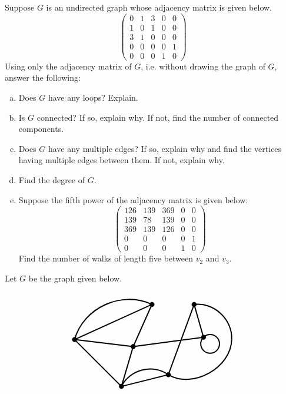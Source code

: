 \documentclass[12pt,letterpaper]{exam}
\begin{document}
\begin{questions}
\newpage
\question[10] Suppose $G$ is an undirected graph whose adjacency matrix is given below. 
	\[
	\begin{pmatrix}
	0 & 1 & 3 & 0 & 0 \\
	1 & 0 & 1 & 0 & 0 \\
	3 & 1 & 0 & 0 & 0 \\
	0 & 0 & 0 & 0 & 1 \\
	0 & 0 & 0 & 1 & 0 
	\end{pmatrix}
	\]
Using only the adjacency matrix of $G$, i.e. without drawing the graph of $G$, answer the following:
        \begin{enumerate}[(a)]
        \item Does $G$ have any loops? Explain.
        \item Is $G$ connected? If so, explain why. If not, find the number of connected components.
        \item Does $G$ have any multiple edges? If so, explain why and find the vertices having multiple edges between them. If not, explain why. 
        \item Find the degree of $G$.
        \item Suppose the fifth power of the adjacency matrix is given below:
		\[
		\begin{pmatrix}
		126 & 139 & 369 & 0 & 0 \\
		139 & 78 & 139 & 0 & 0 \\
		369 & 139 & 126 & 0 & 0 \\
		0 & 0 & 0 & 0 & 1 \\
		0 & 0 & 0 & 1 & 0 
		\end{pmatrix}
		\]
	Find the number of walks of length five between $v_2$ and $v_3$. 
        \end{enumerate}




\newpage
\question[10] Let $G$ be the graph given below.
	\[
	\begin{tikzpicture}
	\draw[line width=0.05cm] (0,0) -- (-2,2) -- (1.3,3.5) -- (0.5,1.7) -- (3.5,2.1) -- (3.1,3.5) -- (2,0.5) -- (0,0);
	\draw[line width=0.05cm] (-2,2) -- (0.5,1.7);
	\draw[line width=0.05cm] (0,0) -- (0.5,1.7);
	\draw[line width=0.05cm, bend left= 50] (-2,2) to (1.3,3.5);
	\draw[line width=0.05cm, bend left= 50] (0,0) to (2,0.5);
	\draw[line width=0.05cm, bend right= 60] (2,0.5) to (4.7,2);
	\draw[line width=0.05cm, bend right= 50] (4.7,2) to (3.1,3.5);
	\draw[line width=0.05cm] (3.782,1.817) circle (0.4);
	
	\draw[fill= black] (0,0) circle (0.1);
	\draw[fill= black] (2,0.5) circle (0.1);
	\draw[fill= black] (-2,2) circle (0.1);
	\draw[fill= black] (0.5,1.7) circle (0.1);
	\draw[fill= black] (3.5,2.1) circle (0.1);
	\draw[fill= black] (1.3,3.5) circle (0.1);
	\draw[fill= black] (3.1,3.5) circle (0.1);
	\end{tikzpicture}
	\]


\end{questions}
\end{document}
